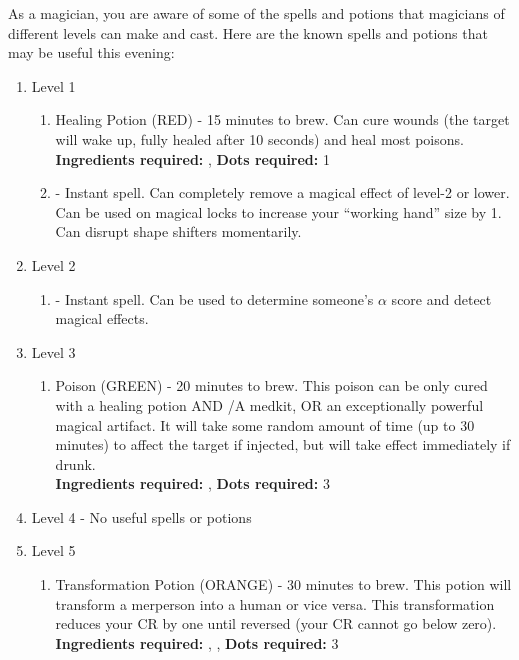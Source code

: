 \documentclass[green]{NeptuneBall}
\begin{document}
As a magician, you are aware of some of the spells and potions that magicians of different levels can make and cast. Here are the known spells and potions that may be useful this evening:
\begin{enumerate}
  \item Level 1
   \begin{enumerate}
     \item Healing Potion (RED) - 15 minutes to brew. Can cure wounds (the target will wake up, fully healed after 10 seconds) and heal most poisons.\\ 
     {\bf Ingredients required:} \iSeaSnake{}, \iSeaFan{}
		 {\bf Dots required:} 1
     \item \aLesserDispel{} - Instant spell. Can completely remove a magical effect of level-2 or lower. Can be used on magical locks to increase your ``working hand'' size by 1. Can disrupt shape shifters momentarily.
   \end{enumerate}
  \item Level 2
   \begin{enumerate}
     \item \aPerceive{} - Instant spell. Can be used to determine someone's $\alpha$ score and detect magical effects.
   \end{enumerate}
  \item Level 3
     \begin{enumerate}
     \item Poison (GREEN) - 20 minutes to brew. This poison can be only cured with a healing potion AND \aFirstAid{}/A medkit, OR an exceptionally powerful magical artifact. It will take some random amount of time (up to 30 minutes) to affect the target if injected, but will take effect immediately if drunk.\\
     {\bf Ingredients required:} \iSeaUrchins{}, \iAnglerFish{}
		 {\bf Dots required:} 3
   \end{enumerate}
   \item Level 4 - No useful spells or potions
   \item Level 5
    \begin{enumerate}
     \item Transformation Potion (ORANGE) - 30 minutes to brew. This potion will transform a merperson into a human or vice versa. This transformation reduces your CR by one until reversed (your CR cannot go below zero).\\
      {\bf Ingredients required:} \iSquid{}, \iSponge{}, \iBarnacle{}
			{\bf Dots required:} 3
   \end{enumerate}

\end{enumerate}
\end{document}
